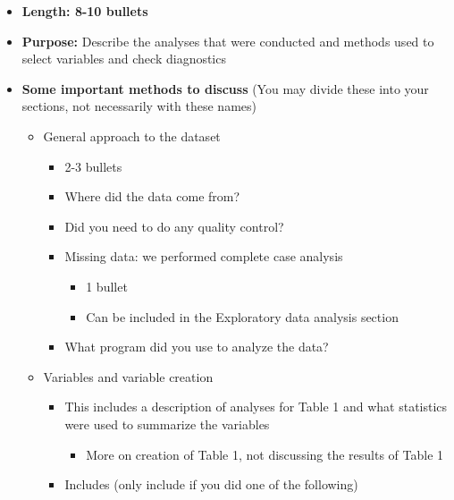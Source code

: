 \documentclass[
  letterpaper,
  DIV=11,
  numbers=noendperiod]{scrartcl}
\providecommand{\tightlist}{%
  \setlength{\itemsep}{0pt}\setlength{\parskip}{0pt}}\usepackage{longtable,booktabs,array}
\begin{document}
\begin{itemize}
\tightlist
\item
  \textbf{Length: 8-10 bullets}
\item
  \textbf{Purpose:} Describe the analyses that were conducted and
  methods used to select variables and check diagnostics
\item
  \textbf{Some important methods to discuss} (You may divide these into
  your sections, not necessarily with these names)

  \begin{itemize}
  \tightlist
  \item
    General approach to the dataset

    \begin{itemize}
    \tightlist
    \item
      2-3 bullets
    \item
      Where did the data come from?
    \item
      Did you need to do any quality control?
    \item
      Missing data: we performed complete case analysis

      \begin{itemize}
      \tightlist
      \item
        1 bullet
      \item
        Can be included in the Exploratory data analysis section
      \end{itemize}
    \item
      What program did you use to analyze the data?
    \end{itemize}
  \item
    Variables and variable creation

    \begin{itemize}
    \tightlist
    \item
      This includes a description of analyses for Table 1 and what
      statistics were used to summarize the variables

      \begin{itemize}
      \tightlist
      \item
        More on creation of Table 1, not discussing the results of Table
        1
      \end{itemize}
    \item
      Includes (only include if you did one of the following)


\end{itemize}
\end{itemize}
\end{itemize}
\end{document}
